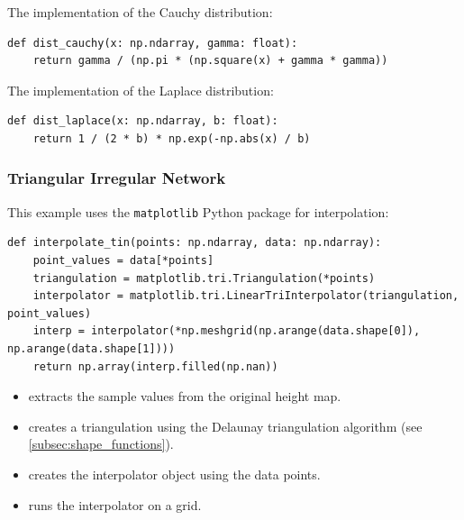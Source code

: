 \begin{minipage}{\textwidth}
The implementation of the Cauchy distribution:
\begin{lstlisting}[language={[AS]Python},caption=The Cauchy distribution for DDW]
def dist_cauchy(x: np.ndarray, gamma: float):
    return gamma / (np.pi * (np.square(x) + gamma * gamma))
\end{lstlisting}
\end{minipage}

\begin{minipage}{\textwidth}
The implementation of the Laplace distribution:
\begin{lstlisting}[language={[AS]Python},caption=The Laplace distribution for DDW]
def dist_laplace(x: np.ndarray, b: float):
    return 1 / (2 * b) * np.exp(-np.abs(x) / b)
\end{lstlisting}
\end{minipage}

\subsubsection{Triangular Irregular Network}

This example uses the \verb|matplotlib| Python package for interpolation:
\begin{lstlisting}[language={[AS]Python},caption=Interpolation with a TIN]
def interpolate_tin(points: np.ndarray, data: np.ndarray):
    point_values = data[*points]
    triangulation = matplotlib.tri.Triangulation(*points)
    interpolator = matplotlib.tri.LinearTriInterpolator(triangulation, point_values)
    interp = interpolator(*np.meshgrid(np.arange(data.shape[0]), np.arange(data.shape[1])))
    return np.array(interp.filled(np.nan))
\end{lstlisting}

\begin{itemize}
    \item {} extracts the sample values from the original height map.
    \item {} creates a triangulation using the Delaunay triangulation algorithm (see \autoref{subsec:shape_functions}).
    \item {} creates the interpolator object using the data points.
    \item {} runs the interpolator on a grid.
\end{itemize}

